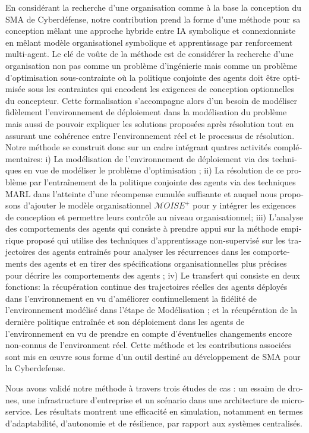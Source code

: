 \begin{otherlanguage}{ngerman}
    En considérant la recherche d'une organisation comme à la base la conception du SMA de Cyberdéfense, notre contribution prend la forme d'une méthode pour sa conception mêlant une approche hybride entre IA symbolique et connexionniste en mêlant modèle organisationel symbolique et apprentissage par renforcement multi-agent. Le clé de voûte de la méthode est de considérer la recherche d'une organisation non pas comme un problème d'ingénierie mais comme un problème d'optimisation sous-contrainte où la politique conjointe des agents doit être optimisée sous les contraintes qui encodent les exigences de conception optionnelles du concepteur. Cette formalisation s'accompagne alors d'un besoin de modéliser fidèlement l'environnement de déploiement dans la modélisation du problème mais aussi de pouvoir expliquer les solutions proposées après résolution tout en assurant une cohérence entre l'environnement réel et le processus de résolution. Notre méthode se construit donc sur un cadre intégrant quatres activités complémentaires: i) La modélisation de l'environnement de déploiement via des techniques  en vue de modéliser le problème d'optimisation ; ii) La résolution de ce problème par l’entraînement de la politique conjointe des agents via des techniques MARL dans l'atteinte d'une récompense cumulée suffisante et auquel nous proposons d'ajouter le modèle organisationnel $\mathcal{M}OISE^+$ pour y intégrer les exigences de conception et permettre leurs contrôle au niveau organisationnel; iii) L'analyse des comportements des agents qui consiste à prendre appui sur la méthode empirique proposé qui utilise des techniques d'apprentissage non-supervisé sur les trajectoires des agents entrainés pour analyser les récurrences dans les comportements des agents et en tirer des spécifications organisationnelles plus précises pour décrire les comportements des agents ; iv) Le transfert qui consiste en deux fonctions: la récupération continue des trajectoires réelles des agents déployés dans l'environnement en vu d'améliorer continuellement la fidélité de l'environnement modélisé dans l'étape de Modélisation ; et la récupération de la dernière politique entraînée et son déploiement dans les agents de l'environnement en vu de prendre en compte d'éventuelles changements encore non-connus de l'environment réel. Cette méthode et les contributions associées sont mis en œuvre sous forme d'un outil destiné au développement de SMA pour la Cyberdefense.
    
    Nous avons validé notre méthode à travers trois études de cas : un essaim de drones, une infrastructure d'entreprise et un scénario dans une architecture de micro-service. Les résultats montrent une efficacité en simulation, notamment en termes d'adaptabilité, d'autonomie et de résilience, par rapport aux systèmes centralisés.


\end{otherlanguage}
